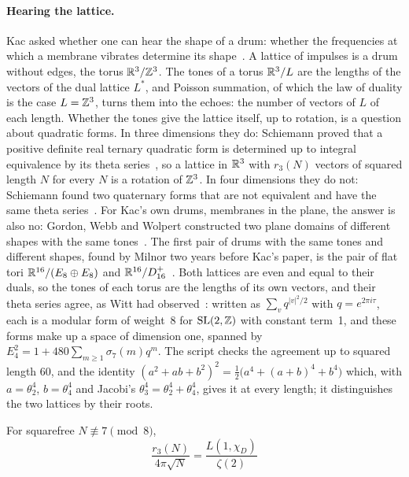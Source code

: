\documentclass[11pt]{article}
\begin{document}
\paragraph{Hearing the lattice.}
Kac asked whether one can hear the shape of a drum: whether the frequencies at which a membrane vibrates determine its shape~\cite{Kac}.
A lattice of impulses is a drum without edges, the torus $\mathbb{R}^3/\mathbb{Z}^3$.
The tones of a torus $\mathbb{R}^3/L$ are the lengths of the vectors of the dual lattice $L^*$, and Poisson summation, of which the law of duality is the case $L=\mathbb{Z}^3$, turns them into the echoes: the number of vectors of $L$ of each length.
Whether the tones give the lattice itself, up to rotation, is a question about quadratic forms.
In three dimensions they do: Schiemann proved that a positive definite real ternary quadratic form is determined up to integral equivalence by its theta series~\cite{Schiemann97}, so a lattice in $\mathbb{R}^3$ with $r_3(N)$ vectors of squared length $N$ for every $N$ is a rotation of $\mathbb{Z}^3$.
In four dimensions they do not: Schiemann found two quaternary forms that are not equivalent and have the same theta series~\cite{Schiemann90}.
For Kac's own drums, membranes in the plane, the answer is also no: Gordon, Webb and Wolpert constructed two plane domains of different shapes with the same tones~\cite{GordonWebbWolpert}.
The first pair of drums with the same tones and different shapes, found by Milnor two years before Kac's paper, is the pair of flat tori $\mathbb{R}^{16}/(E_8\oplus E_8)$ and $\mathbb{R}^{16}/D_{16}^+$~\cite{Milnor}.
Both lattices are even and equal to their duals, so the tones of each torus are the lengths of its own vectors, and their theta series agree, as Witt had observed~\cite{Witt}: written as $\sum_v q^{|v|^2/2}$ with $q=e^{2\pi i\tau}$, each is a modular form of weight~8 for $\mathrm{SL}(2,\mathbb{Z})$ with constant term~1, and these forms make up a space of dimension one, spanned by $E_4^2 = 1+480\sum_{m\ge1}\sigma_7(m)q^m$.
The script  checks the agreement up to squared length 60, and the identity $(a^2+ab+b^2)^2=\tfrac12\bigl(a^4+(a+b)^4+b^4\bigr)$ which, with $a=\theta_2^4$, $b=\theta_4^4$ and Jacobi's $\theta_3^4=\theta_2^4+\theta_4^4$, gives it at every length; it distinguishes the two lattices by their roots.

\begin{derivation}\label{d:size}
For squarefree $N\not\equiv7\pmod8$,
\[
  \boxed{\;\frac{r_3(N)}{4\pi\sqrt N} = \frac{L(1,\chi_D)}{\zeta(2)}\;}
\]
\end{derivation}
\end{document}
